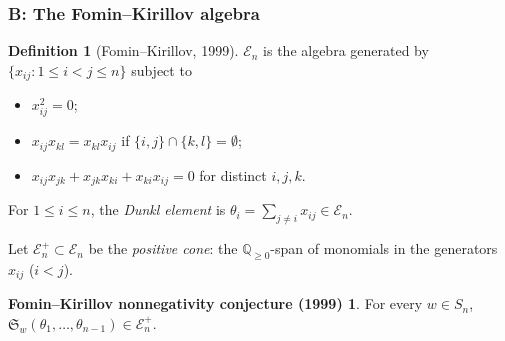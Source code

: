 \documentclass{beamer}
\theoremstyle{definition}
\newtheorem{defn}[thm]{Definition}
\newtheorem*{FKnonneg}{Fomin--Kirillov nonnegativity conjecture (1999)}
\newcommand\QQ{\mathbb{Q}}
\begin{document}
\begin{frame}
  \frametitle{B: The Fomin--Kirillov algebra}
  \begin{defn}[Fomin--Kirillov, 1999]
    \( \mathcal{E}_n \) is the algebra generated by \( \{x_{ij} : 1 \le i < j \le n\} \)
    subject to
    \begin{itemize}
      \item[$\bullet$] \( x_{ij}^2 = 0 \);
      \item[$\bullet$] \( x_{ij}x_{kl} = x_{kl}x_{ij} \) if \( \{i,j\} \cap \{k,l\} = \emptyset \);
      \item[$\bullet$] \( x_{ij}x_{jk} + x_{jk}x_{ki} + x_{ki}x_{ij} = 0 \) for distinct \( i,j,k \).
    \end{itemize}
  \end{defn}
  \pause

  For \( 1 \le i \le n \), the \emph{Dunkl element} is
  \(
    \theta_i = \sum_{j \ne i} x_{ij} \in \mathcal{E}_n.
  \)
  \pause
  \vspace{.15cm}

  Let \( \mathcal{E}_n^+ \subset \mathcal{E}_n \) be the \emph{positive cone}: the
  \( \QQ_{\ge 0} \)-span of monomials in the generators \( x_{ij} \) (\( i<j \)).
  \pause

  \begin{FKnonneg}
    For every \( w \in S_n \),
    \(
      \mathfrak{S}_w(\theta_1, \ldots, \theta_{n-1}) \in \mathcal{E}_n^+.
    \)
  \end{FKnonneg}

\end{frame}

\end{document}
